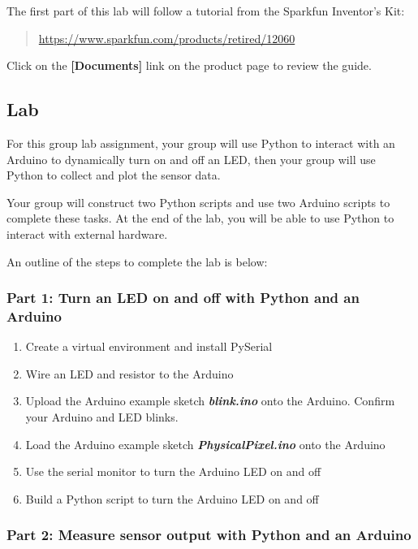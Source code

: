 \documentclass[11pt]{article}
\begin{document}
The first part of this lab will follow a tutorial from the Sparkfun
Inventor's Kit:

\begin{quote}
\url{https://www.sparkfun.com/products/retired/12060}
\end{quote}

Click on the \textbf{{[}Documents{]}} link on the product page to review
the guide.

    \hypertarget{lab}{%
\subsection{Lab}\label{lab}}

For this group lab assignment, your group will use Python to interact
with an Arduino to dynamically turn on and off an LED, then your group
will use Python to collect and plot the sensor data.

Your group will construct two Python scripts and use two Arduino scripts
to complete these tasks. At the end of the lab, you will be able to use
Python to interact with external hardware.

    An outline of the steps to complete the lab is below:

\hypertarget{part-1-turn-an-led-on-and-off-with-python-and-an-arduino}{%
\subsubsection{Part 1: Turn an LED on and off with Python and an
Arduino}\label{part-1-turn-an-led-on-and-off-with-python-and-an-arduino}}

\begin{enumerate}
\def\labelenumi{(\alph{enumi})}
\item
  Create a virtual environment and install PySerial
\item
  Wire an LED and resistor to the Arduino
\item
  Upload the Arduino example sketch \textbf{\emph{blink.ino}} onto the
  Arduino. Confirm your Arduino and LED blinks.
\item
  Load the Arduino example sketch \textbf{\emph{PhysicalPixel.ino}} onto
  the Arduino
\item
  Use the serial monitor to turn the Arduino LED on and off
\item
  Build a Python script to turn the Arduino LED on and off
\end{enumerate}

    \hypertarget{part-2-measure-sensor-output-with-python-and-an-arduino}{%
\subsubsection{Part 2: Measure sensor output with Python and an
Arduino}\label{part-2-measure-sensor-output-with-python-and-an-arduino}}
\end{document}
